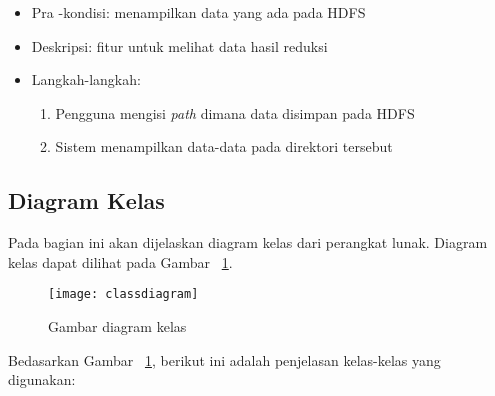\begin{enumerate}
\begin{itemize}
\item Pra -kondisi: menampilkan data yang ada pada HDFS

\item Deskripsi: fitur untuk melihat data hasil reduksi

\item Langkah-langkah:

\begin{enumerate}

\item Pengguna mengisi \textit{path} dimana data disimpan pada HDFS

\item Sistem menampilkan data-data pada direktori tersebut

\end{enumerate}

\end{itemize}

\end{enumerate}


\subsection{Diagram Kelas}

Pada bagian ini akan dijelaskan diagram kelas dari perangkat lunak. Diagram kelas dapat dilihat pada Gambar ~\ref{fig:classdiagram}.

\begin{figure}[H]
    \centering  
    \texttt{[image: classdiagram]}  
    \caption[Gambar diagram kelas]{Gambar diagram kelas} 
    \label{fig:classdiagram} 
\end{figure}

Bedasarkan Gambar ~\ref{fig:classdiagram}, berikut ini adalah penjelasan kelas-kelas yang digunakan:

